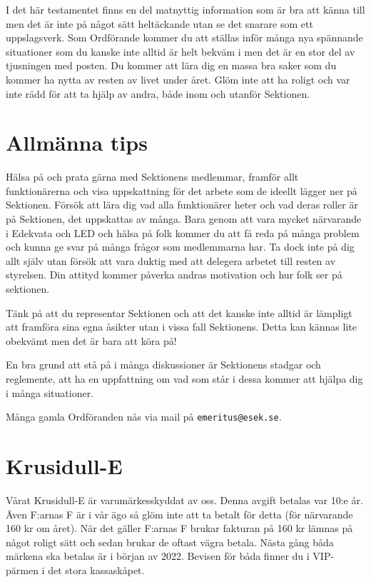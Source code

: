 \documentclass[10pt]{article}
\begin{document}
    \heading{\doctitle}
    
    I det här testamentet finns en del matnyttig information som är bra att känna till men det är inte på något sätt heltäckande utan se det snarare som ett uppslagsverk. Som Ordförande kommer du att ställas inför många nya spännande situationer som du kanske inte alltid är helt bekväm i men det är en stor del av tjusningen med posten. Du kommer att lära dig en massa bra saker som du kommer ha nytta av resten av livet under året. Glöm inte att ha roligt och var inte rädd för att ta hjälp av andra, både inom och utanför Sektionen.
    
    \newpage
    
    \tableofcontents
    \newpage
    
    \section{Allmänna tips}
    
    Hälsa på och prata gärna med Sektionens medlemmar, framför allt funktionärerna och visa uppskattning för det arbete som de ideellt lägger ner på Sektionen. Försök att lära dig vad alla funktionärer heter och vad deras roller är på Sektionen, det uppskattas av många. Bara genom att vara mycket närvarande i Edekvata och LED och hälsa på folk kommer du att få reda på många problem och kunna ge svar på många frågor som medlemmarna har. Ta dock inte på dig allt själv utan försök att vara duktig med att delegera arbetet till resten av styrelsen. Din attityd kommer påverka andras motivation och hur folk ser på sektionen.
    
    Tänk på att du representar Sektionen och att det kanske inte alltid är lämpligt att framföra sina egna åsikter utan i vissa fall Sektionens. Detta kan kännas lite obekvämt men det är bara att köra på!
    
    En bra grund att stå på i många diskussioner är Sektionens stadgar och reglemente, att ha en uppfattning om vad som står i dessa kommer att hjälpa dig i många situationer.
    
    Många gamla Ordföranden nås via mail på \texttt{emeritus@esek.se}.
    
    \section{Krusidull-E}
    
    Vårat Krusidull-E är varumärkesskyddat av oss. Denna avgift betalas var 10:e år. Även F:arnas F är i vår ägo så glöm inte att ta betalt för detta (för närvarande 160 kr om året). När det gäller F:arnas F brukar fakturan på 160 kr lämnas på något roligt sätt och sedan brukar de oftast vägra betala. Nästa gång båda märkena ska betalas är i början av 2022. Bevisen för båda finner du i VIP-pärmen i det stora kassaskåpet.
    
\end{document}
